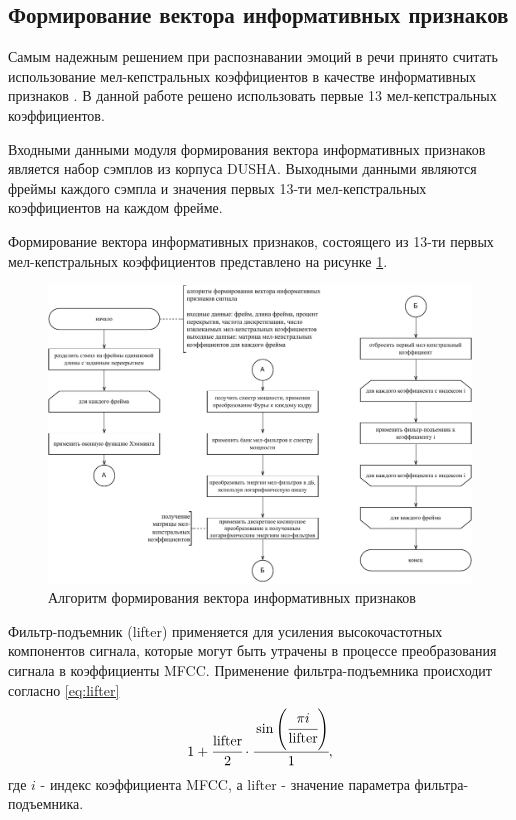 \subsection{Формирование вектора информативных признаков}
Самым надежным решением при распознавании эмоций в речи принято считать использование мел-кепстральных коэффициентов в качестве информативных признаков \cite{review}. В данной работе решено использовать первые 13 мел-кепстральных коэффициентов.

Входными данными модуля формирования вектора информативных признаков является набор сэмплов из корпуса DUSHA. Выходными данными являются фреймы каждого сэмпла и значения первых 13-ти мел-кепстральных коэффициентов на каждом фрейме.

Формирование вектора информативных признаков, состоящего из 13-ти первых мел-кепстральных коэффициентов представлено на рисунке \ref{fig:mfcc-vector}.
\begin{figure}[H]
	\centering
	\includegraphics[width=\linewidth]{assets/mfccs-flowchart}
	\caption{Алгоритм формирования вектора информативных признаков}
	\label{fig:mfcc-vector}
\end{figure}

Фильтр-подъемник (lifter) применяется для усиления высокочастотных компонентов сигнала, которые могут быть утрачены в процессе преобразования сигнала в коэффициенты MFCC. Применение фильтра-подъемника происходит согласно \ref{eq:lifter}
\begin{equation}\label{eq:lifter}
	1 + \cfrac{\mathrm{lifter}}{2} \cdot \cfrac{\sin\left(\cfrac{\pi i}{\mathrm{lifter}}\right)}{1},
\end{equation}
где $i$ - индекс коэффициента MFCC, а $\mathrm{lifter}$ - значение параметра фильтра-подъемника.
